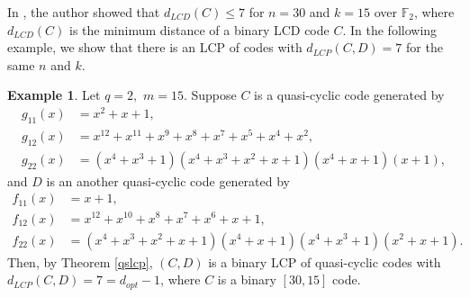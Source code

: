 \documentclass[12 pt]{extarticle}
\numberwithin{equation}{section}
\theoremstyle{definition}
\newtheorem{example}{Example}[section]
\begin{document}

In \cite{Bouyuklieva2020}, the author showed that $d_{LCD}(C)\leq 7$ for $n=30$ and $k=15$ over $\mathbb{F}_2$, where $d_{LCD}(C)$ is the minimum distance of a binary LCD code $C$. In the following example, we show that there is an LCP of codes with $d_{LCP}(C,D)=7$ for the same $n$ and $k$.

\begin{example}
	Let $q=2,$ $m=15$. Suppose $C$ is a quasi-cyclic code generated by 
	\begin{equation*}
		\begin{split}
			g_{11}(x)&=x^2 + x + 1,\\ 
			g_{12}(x)&=x^{12} + x^{11}+ x^9 + x^8 + x^7 + x^5+ x^4 + x^2,\\
			g_{22}(x)&=(x^4 + x^3 + 1)(x^4 + x^3 + x^2 + x + 1)(x^4 + x + 1)(x+1),
		\end{split}
	\end{equation*}
	and $D$ is an another quasi-cyclic code generated by 
	\begin{equation*}
		\begin{split}
			f_{11}(x)&=x + 1,\\ 
			f_{12}(x)&=x^{12} + x^{10}+ x^8 + x^7 + x^6+ x + 1,\\
			f_{22}(x)&=(x^4 + x^3 + x^2 + x + 1)(x^4 + x + 1)(x^4 + x^3 + 1)(x^2 + x + 1).
		\end{split}
	\end{equation*}
	Then, by Theorem \ref{qslcp}, $(C,D)$ is a binary LCP of quasi-cyclic codes with $d_{LCP}(C,D)=7=d_{opt}-1$, where $C$ is a binary $[30,15]$ code.
\end{example}
\end{document}
